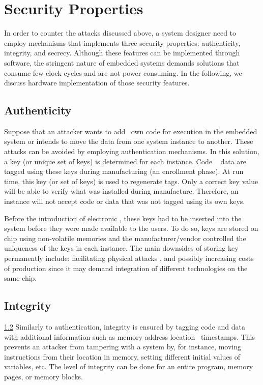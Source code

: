 \section{Security Properties}
\label{sec:securityproperties}
In order to counter the attacks discussed above, a system designer need to employ mechanisms that implements three security properties: authenticity, integrity, and secrecy. Although these features can be implemented through software, the stringent nature of embedded systems demands solutions that consume few clock cycles and are not power consuming.
In the following, we discuss hardware implementation of those security features.

\subsection{Authenticity}
\label{subsec:Authenticity}
Suppose that an attacker wants to add \hisher~own code for execution in the embedded system or intends to move the data from one system instance to another. These attacks can be avoided by employing authentication mechanisms. In this solution, a key (or unique set of keys) is determined for each instance.
Code \andor~ data are tagged using these keys during manufacturing (an enrollment phase). At run time, this key (or set of keys) is used to regenerate tags. Only a correct key value will be able to verify what was installed during manufacture. Therefore, an instance will not accept code or data that was not tagged using its own keys.

Before the introduction of electronic \pufs \cite{Gassend2002:PUFs}, these keys had to be inserted into the system  before they were made available to the users. To do so, keys are stored on chip using non-volatile memories and the manufacturer\slash{}vendor controlled the uniqueness of the keys in each instance. The main downsides of storing key permanently include: facilitating physical attacks \cite{Sadeghi2010:Security-PUFs}, and possibly increasing costs of production since it may demand integration of different technologies on the same chip.

\subsection{Integrity}
\label{subsec:integrity}
\ref{subsec:integrity}
Similarly  to authentication, integrity is ensured by tagging code and data with additional information such as memory address location \andor~timestamps. This prevents an attacker from tampering with a system by, for instance, moving instructions from their location in memory, setting different initial values of variables, etc. The level of integrity can be done for an entire program, memory pages, or memory blocks. 

